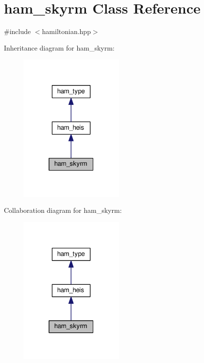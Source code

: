 \hypertarget{classham__skyrm}{}\section{ham\+\_\+skyrm Class Reference}
\label{classham__skyrm}


{\ttfamily \#include $<$hamiltonian.\+hpp$>$}



Inheritance diagram for ham\+\_\+skyrm\+:\nopagebreak
\begin{figure}[H]
\begin{center}
\leavevmode
\includegraphics[width=148pt]{d0/d5b/classham__skyrm__inherit__graph}
\end{center}
\end{figure}


Collaboration diagram for ham\+\_\+skyrm\+:\nopagebreak
\begin{figure}[H]
\begin{center}
\leavevmode
\includegraphics[width=148pt]{d6/d7d/classham__skyrm__coll__graph}
\end{center}
\end{figure}
